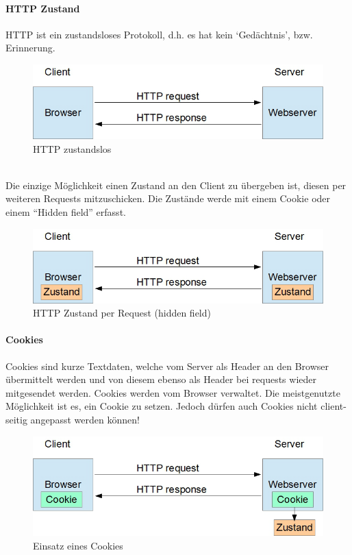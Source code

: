 \documentclass[10pt,a4paper]{article}
\begin{document}
\paragraph*{HTTP Zustand} HTTP ist ein zustandsloses Protokoll, d.h. es hat kein `Gedächtnis', bzw. Erinnerung.
\begin{figure}[ht]
    \begin{center}
    \includegraphics[width=12cm]{images/HTTPZustand0.png}
    \caption{HTTP zustandslos}
    \label{HTTPZustandslos}
    \end{center}
\end{figure}\\
Die einzige Möglichkeit einen Zustand an den Client zu übergeben ist, diesen per weiteren Requests mitzuschicken. Die Zustände werde mit einem Cookie oder einem "`Hidden field"' erfasst.
\begin{figure}[ht]
    \begin{center}
    \includegraphics[width=12cm]{images/HTTPZustand1.png}
    \caption{HTTP Zustand per Request (hidden field)}
    \label{HTTPZustand}
    \end{center}
\end{figure}
\paragraph*{Cookies}Cookies sind kurze Textdaten, welche vom Server als Header an den Browser übermittelt werden und von diesem ebenso als Header bei requests wieder mitgesendet werden. Cookies werden vom Browser verwaltet. Die meistgenutzte Möglichkeit ist es, ein Cookie zu setzen. Jedoch dürfen auch Cookies nicht client-seitig angepasst werden können!
\begin{figure}[ht]
    \begin{center}
    \includegraphics[width=12cm]{images/HTTPCookie.png}
    \caption{Einsatz eines Cookies}
    \label{HTTPCookie}
    \end{center}
\end{figure}
\end{document}
